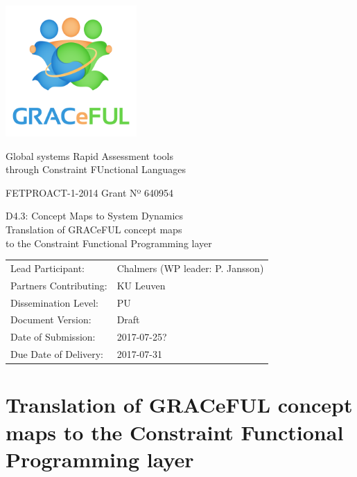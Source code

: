 \documentclass{article}
\author{}
\date{}
\begin{document}
\begin{center}
\includegraphics[width=5cm]{../coverpage/GRACeFULlogo.png}

\textcolor{GRACeFULblue}{Global systems Rapid Assessment tools\\
through Constraint FUnctional Languages}

\vspace{1cm}

FETPROACT-1-2014 Grant Nº 640954

\end{center}

\begin{framed}
\begin{center}
\Large
D4.3: Concept Maps to System Dynamics\\[1ex]

\large
Translation of GRACeFUL concept maps\\
to the Constraint Functional Programming layer\\[1ex]

\end{center}
\end{framed}

\vspace{1cm}

\noindent
\begin{tabular}{@{}ll@{}}
  Lead Participant:       & Chalmers (WP leader: P. Jansson)
\\Partners Contributing:  & KU Leuven
\\Dissemination Level:    & PU
\\Document Version:       & Draft
\\Date of Submission:     & 2017-07-25?
\\Due Date of Delivery:   & 2017-07-31
\end{tabular}

\newpage

\section*{Translation of GRACeFUL concept maps to the Constraint Functional Programming layer}\label{DSL4GRACeFUL}
\end{document}
